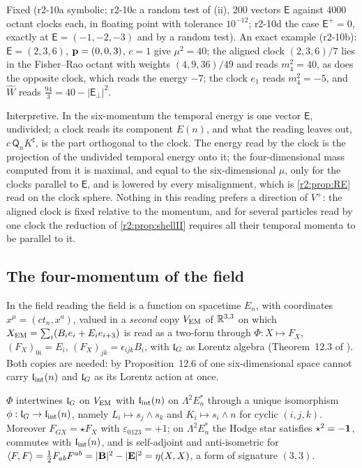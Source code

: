 Fixed (r2-10a symbolic; r2-10c a random test of (ii), 200 vectors $\boldsymbol{\mathsf E}$ against 4000 octant clocks each, in floating point with tolerance
$10^{-12}$; r2-10d the case $\boldsymbol{\mathsf E}^+=0$, exactly at $\boldsymbol{\mathsf E}=(-1,-2,-3)$ and by a random test). An exact example (r2-10b): $\boldsymbol{\mathsf E}=(2,3,6)$, $\mathbf p=(0,0,3)$, $c=1$ give $\mu^2=40$; the aligned clock $(2,3,6)/7$ lies in the
Fisher--Rao octant with weights $(4,9,36)/49$ and reads $m_4^2=40$, as does the opposite clock, which reads the energy $-7$; the clock $e_1$ reads $m_4^2=-5$, and $\widehat W$ reads $\tfrac{94}3=40-|\boldsymbol{\mathsf E}_\perp|^2$.

\begin{remark}
\label{r2:rem:projection}
Interpretive. In the six-momentum the temporal energy is one vector $\boldsymbol{\mathsf E}$, undivided; a clock reads its component $E(n)$, and what the
reading leaves out, $c\,\mathsf Q_nK^\sharp$, is the part orthogonal to the clock. The energy read by the clock is the projection of the undivided
temporal energy onto it; the four-dimensional mass computed from it is maximal, and equal to the six-dimensional $\mu$, only for the clocks parallel
to $\boldsymbol{\mathsf E}$, and is lowered by every misalignment, which is \cref{r2:prop:RE} read on the clock sphere. Nothing in this reading prefers a direction of $V^+$: the aligned clock is fixed relative to the momentum,
and for several particles read by one clock the reduction of \cref{r2:prop:shellII} requires all their temporal momenta to be parallel to it.
\end{remark}

\subsection{The four-momentum of the field}
\label{r2:sec:field}

In the field reading the field is a function on spacetime $E_n$, with coordinates $x^\mu=(ct_n,x^a)$, valued in a \emph{second} copy $V_{\rm EM}$ of
$\mathbb{R}^{3,3}$ on which $X_{\rm EM}=\sum_i(B_ie_i+E_ie_{i+3})$ is read as a two-form through $\Phi:X\mapsto F_X$, $(F_X)_{0i}=E_i$, $(F_X)_{jk}=\epsilon_{ijk}B_i$, with
$\mathfrak l_G$ as Lorentz algebra (Theorem~12.3 of \cite{ES17}). Both copies are needed: by Proposition~12.6 of \cite{ES17} one six-dimensional space cannot carry
$\mathfrak l_{\rm int}(n)$ and $\mathfrak l_G$ as its Lorentz action at once.

\begin{proposition}
\label{r2:prop:dict}
$\Phi$ intertwines $\mathfrak l_G$ on $V_{\rm EM}$ with $\mathfrak l_{\rm int}(n)$ on $\Lambda^2E_n^*$ through a unique isomorphism $\phi:\mathfrak l_G\to\mathfrak l_{\rm int}(n)$, namely
$L_i\mapsto s_j\wedge s_k$ and $K_i\mapsto s_i\wedge n$ for cyclic $(i,j,k)$. Moreover $F_{GX}=\star F_X$ with $\varepsilon_{0123}=+1$; on $\Lambda^2E_n^*$ the
Hodge star satisfies $\star^2=-\mathbf 1$, commutes with $\mathfrak l_{\rm int}(n)$, and is self-adjoint and anti-isometric for $\langle F,F\rangle=\tfrac12F_{ab}F^{ab}=|\mathbf B|^2-|\mathbf E|^2
=\eta(X,X)$, a form of signature $(3,3)$.
\end{proposition}

